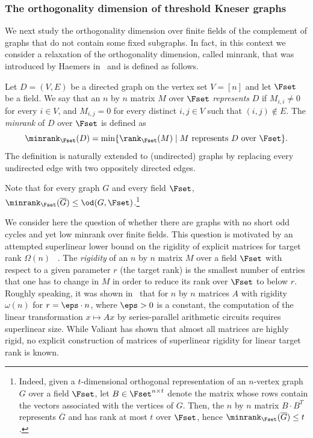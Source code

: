 %
\subsubsection{The orthogonality dimension of threshold Kneser graphs}
%

We next
%
%
study
the orthogonality dimension over finite fields of the complement of graphs that do not contain some fixed subgraphs.
In fact, in this context we consider %
%
a relaxation %
of the orthogonality dimension,
%
%
%
%
called minrank, that was introduced by Haemers in~\cite{Haemers79, Haemers81} and is defined as follows.

\begin{definition}[Minrank]\label{def:minrank}
Let $D=(V,E)$ be a directed graph on the vertex set $V=[n]$ and let $\Fset$ be a field.
We say that an $n$ by $n$ matrix $M$ over $\Fset$ \emph{represents} $D$ if $M_{i,i} \neq 0$ for every $i \in V$, and $M_{i,j}=0$ for every distinct $i,j \in V$ such that $(i,j) \notin E$.
The \emph{minrank} of $D$ over $\Fset$ is defined as
\[{\minrank}_{\Fset}(D) =  \min\{{\rank}_{\Fset}(M)\mid M \mbox{ represents }D\mbox{ over }\Fset\}.\]
The definition is naturally extended to (undirected) graphs by replacing every undirected edge with two oppositely directed edges.
\end{definition}
\noindent
Note that for every graph $G$ and every field $\Fset$, ${\minrank}_{\Fset}(\overline{G}) \leq \od(G,\Fset)$.\footnote{Indeed, given a $t$-dimensional orthogonal representation of an $n$-vertex graph $G$ over a field $\Fset$,
%
%
let $B \in \Fset^{n \times t}$ denote the matrix
whose rows contain the vectors associated with the vertices of $G$. Then, the $n$ by $n$ matrix $B \cdot B^T$ represents $\overline{G}$ and has rank at most $t$ over $\Fset$, hence ${\minrank}_{\Fset}(\overline{G}) \leq t$.}

%
%

We consider here the question of whether there are graphs with no short odd cycles and yet low minrank over finite fields.
%
%
This question is motivated by an attempted superlinear lower bound on the rigidity of explicit matrices
for target rank $\Omega(n)$%
%
%
~\cite{CodenottiPR00}. The \emph{rigidity} of an $n$ by $n$ matrix $M$ over a field $\Fset$ with respect to a given parameter $r$
(the target rank)  %
%
is the smallest number of entries that one has to change in $M$ in order to reduce its rank over $\Fset$ to below $r$.
%
Roughly speaking, it was shown in~\cite{Valiant77,C08} that
%
%
%
for $n$ by $n$ matrices $A$ with rigidity $\omega(n)$
for $r = \eps \cdot n$, where $\eps> 0$ is a constant,
the computation of the linear transformation $x\mapsto Ax$
%
%
%
%
by series-parallel arithmetic circuits requires superlinear size.
While Valiant has shown that almost all matrices are highly rigid,
%
%
no explicit construction of matrices
%
%
of superlinear rigidity for linear target rank is known.  %


